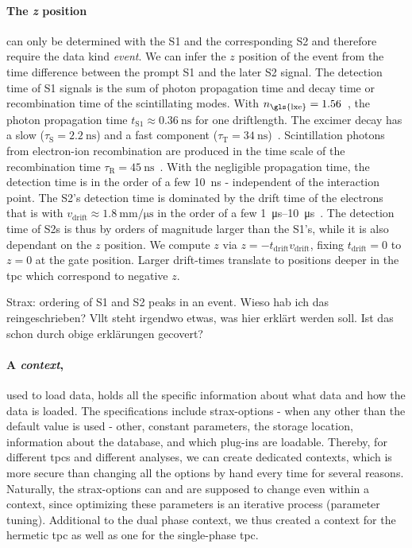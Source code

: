 \paragraph{The \emph{z} position} can only be determined with the S1 and the corresponding S2 and therefore require the data kind \emph{event}.
We can infer the $ z $ position of the event from the time difference between the prompt S1 and the later S2 signal.
The detection time of S1 signals is the sum of photon propagation time and decay time or recombination time of the scintillating modes.
With $ n_\mathrm{\gls{lxe}} = 1.56 $~\cite{Solovov04}, the photon propagation time $ t_\mathrm{S1} \approx \SI{0.36}{\nano\second} $ for one driftlength.
The excimer decay has a slow ($ \tau_\mathrm{S} = \SI{2.2}{\nano\second} $) and a fast component ($ \tau_\mathrm{T} = \SI{34}{\nano\second} $)~\cite{Kubota78}.
Scintillation photons from electron-ion recombination are produced in the time scale of the recombination time $ \tau_\mathrm{R} = \SI{45}{\nano\second} $~\cite{Hitachi83}.
With the negligible propagation time, the detection time is in the order of a few \SI{10}{\nano\second} - independent of the interaction point.
The S2's detection time is dominated by the drift time of the electrons that is with $ v_\mathrm{drift} \approx \SI{1.8}{\milli\meter\per\micro\second} $ in the order of a few \SIrange{1}{10}{\micro\second}~\cite{Aalbers18}.
The detection time of S2s is thus by orders of magnitude larger than the S1's, while it is also dependant on the $ z $ position.
We compute $ z $ via $ z = - t_\mathrm{drift} v_\mathrm{drift} $, fixing $ t_\mathrm{drift} = 0 $ to $ z = 0 $ at the gate position.
Larger drift-times translate to positions deeper in the \gls{tpc} which correspond to negative $ z $.


Strax: ordering of S1 and S2 peaks in an event. Wieso hab ich das reingeschrieben? Vllt steht irgendwo etwas, was hier erklärt werden soll. Ist das schon durch obige erklärungen gecovert?

\paragraph{A \emph{context},} used to load data, holds all the specific information about what data and how the data is loaded.  The specifications include strax-options - when any other than the default value is used - other, constant parameters, the storage location, information about the database, and which plug-ins are loadable.  Thereby, for different \glspl{tpc} and different analyses, we can create dedicated contexts, which is more secure than changing all the options by hand every time for several reasons.  Naturally, the strax-options can and are supposed to change even within a context, since optimizing these parameters is an iterative process (parameter tuning).  Additional to the dual phase context, we thus created a context for the hermetic \gls{tpc} as well as one for the single-phase \gls{tpc}.



